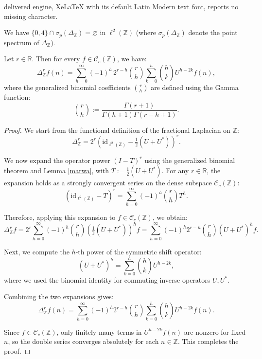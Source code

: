 \documentclass[10pt,a4paper]{amsart}
\newcommand{\Z}{{\mathbb{Z}}}
\begin{document}
delivered engine, XeLaTeX with its default Latin Modern text font, reports no missing character.
\begin{lemma}\label{marwa}
We have $\{0,4\}\cap\sigma_p(\Delta_{\Z})=\varnothing$ in $\ell^{2}(\Z)$ (where $\sigma_p(\Delta_{\Z})$ denote the point spectrum of $\Delta_{\Z}$).

\end{lemma}

\begin{proposition}\label{f-calculus}
Let \( r \in \mathbb{R} \). Then for every \( f \in \mathcal{C}_c(\mathbb{Z}) \), we have:
\begin{equation}\label{eq:binom-DeltaZ}
\Delta_{\mathbb{Z}}^r f(n)
= \sum_{h=0}^\infty (-1)^h\, 2^{r-h} \binom{r}{h}
\sum_{k=0}^h \binom{h}{k} U^{h - 2k} f(n),
\end{equation}
where the generalized binomial coefficients \( \binom{r}{h} \) are defined using the Gamma function:
\[
\binom{r}{h} := \frac{\Gamma(r+1)}{\Gamma(h+1)\Gamma(r - h + 1)}.
\]
\end{proposition}

\begin{proof}
We start from the functional definition of the fractional Laplacian on \( \mathbb{Z} \):
\[
\Delta^r_{\mathbb{Z}} = 2^r \left( \mathrm{id}_{\ell^2(\Z)} - \tfrac{1}{2}(U + U^*) \right)^r.
\]

We now expand the operator power \( (I - T)^r \) using the generalized binomial theorem and Lemma \ref{marwa}, with \( T := \tfrac{1}{2}(U + U^*) \). For any \( r \in \mathbb{R} \), the expansion holds as a strongly convergent series on the dense subspace \( \mathcal{C}_c(\mathbb{Z}) \):
\[
(\mathrm{id}_{\ell^2(\Z)} - T)^r = \sum_{h=0}^\infty (-1)^h \binom{r}{h} T^h.
\]

Therefore, applying this expansion to \( f \in \mathcal{C}_c(\mathbb{Z}) \), we obtain:
\[
\Delta^r_{\mathbb{Z}} f
= 2^r \sum_{h=0}^\infty (-1)^h \binom{r}{h} \left( \tfrac{1}{2}(U + U^*) \right)^h f
= \sum_{h=0}^\infty (-1)^h 2^{r - h} \binom{r}{h} (U + U^*)^h f.
\]

Next, we compute the \( h \)-th power of the symmetric shift operator:
\[
(U + U^*)^h = \sum_{k=0}^h \binom{h}{k} U^{h - 2k},
\]
where we used the binomial identity for commuting  inverse operators \( U, U^* \).

Combining the two expansions gives:
\[
\Delta^r_{\mathbb{Z}} f(n)
= \sum_{h=0}^\infty (-1)^h 2^{r - h} \binom{r}{h} \sum_{k=0}^h \binom{h}{k} U^{h - 2k} f(n).
\]

Since \( f \in \mathcal{C}_c(\mathbb{Z}) \), only finitely many terms in \( U^{h - 2k} f(n) \) are nonzero for fixed \( n \), so the double series converges absolutely for each \( n \in \mathbb{Z} \). This completes the proof.
\end{proof}
\end{document}
